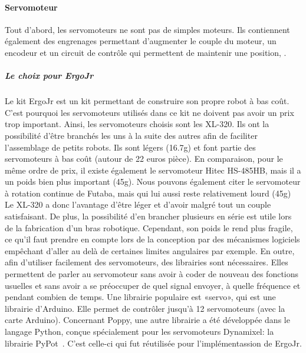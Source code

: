             \paragraph{Servomoteur}
                    Tout d'abord, les servomoteurs ne sont pas de simples moteurs. Ils contiennent également des engrenages permettant d'augmenter le couple du moteur, un encodeur et un circuit de contrôle qui permettent de maintenir une position, \etc.
                   ~
                \subparagraph{Le choix pour ErgoJr}
                    Le kit ErgoJr est un kit permettant de construire son propre robot à bas coût. C'est pourquoi les servomoteurs utilisés dans ce kit ne doivent pas avoir un prix trop important.
                    Ainsi, les servomoteurs choisis sont les XL-320. Ils ont la possibilité d'être branchés les uns à la suite des autres afin de faciliter l'assemblage de petits robots. Ils sont légers (16.7g) et font partie des servomoteurs à bas coût (autour de 22 euros pièce). %
                    En comparaison, pour le même ordre de prix, il existe également le servomoteur Hitec HS-485HB, mais il a un poids bien plus important (45g).%
                    Nous pouvons également citer le servomoteur à rotation continue de Futaba, mais qui lui aussi reste relativement lourd (45g)%
                    Le XL-320 a donc l'avantage d'être léger et d'avoir malgré tout un couple satisfaisant. De plus, la possibilité d'en brancher plusieurs en série est utile lors de la fabrication d'un bras robotique. Cependant, son poids le rend plus fragile, ce qu'il faut prendre en compte lors de la conception par des mécanismes logiciels empêchant d'aller au delà de certaines limites angulaires par exemple.
                    En outre, afin d'utiliser facilement des servomoteurs, des librairies sont nécessaires. Elles permettent de parler au servomoteur sans avoir à coder de nouveau des fonctions usuelles et sans avoir a se préoccuper de quel signal envoyer, à quelle fréquence et pendant combien de temps. Une librairie populaire est «servo», qui est une librairie d'Arduino. Elle permet de contrôler jusqu'à 12 servomoteurs (avec la carte Arduino).
                    Concernant Poppy, une autre librairie a été développée dans le langage Python, conçue spécialement pour les servomoteurs Dynamixel: la librairie PyPot~. C'est celle-ci qui fut réutilisée pour l'implémentassion de ErgoJr.
